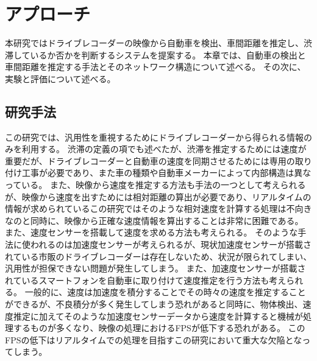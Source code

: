 \chapter{アプローチ}
本研究ではドライブレコーダーの映像から自動車を検出、車間距離を推定し、渋滞しているか否かを判断するシステムを提案する。
本章では、自動車の検出と車間距離を推定する手法とそのネットワーク構造について述べる。
その次に、実験と評価について述べる。

\section{研究手法}
この研究では、汎用性を重視するためにドライブレコーダーから得られる情報のみを利用する。
渋滞の定義の項でも述べたが、渋滞を推定するためには速度が重要だが、ドライブレコーダーと自動車の速度を同期させるためには専用の取り付け工事が必要であり、また車の種類や自動車メーカーによって内部構造は異なっている。
また、映像から速度を推定する方法も手法の一つとして考えられるが、映像から速度を出すためには相対距離の算出が必要であり、リアルタイムの情報が求められているこの研究ではそのような相対速度を計算する処理は不向きなのと同時に、映像から正確な速度情報を算出することは非常に困難である。
また、速度センサーを搭載して速度を求める方法も考えられる。
そのような手法に使われるのは加速度センサーが考えられるが、現状加速度センサーが搭載されている市販のドライブレコーダーは存在しないため、状況が限られてしまい、汎用性が担保できない問題が発生してしまう。
また、加速度センサーが搭載されているスマートフォンを自動車に取り付けて速度推定を行う方法も考えられる。
一般的に、速度は加速度を積分することでその時々の速度を推定することができるが、不良積分が多く発生してしまう恐れがあると同時に、物体検出、速度推定に加えてそのような加速度センサーデータから速度を計算すると機械が処理するものが多くなり、映像の処理におけるFPSが低下する恐れがある。
このFPSの低下はリアルタイムでの処理を目指すこの研究において重大な欠陥となってしまう。

